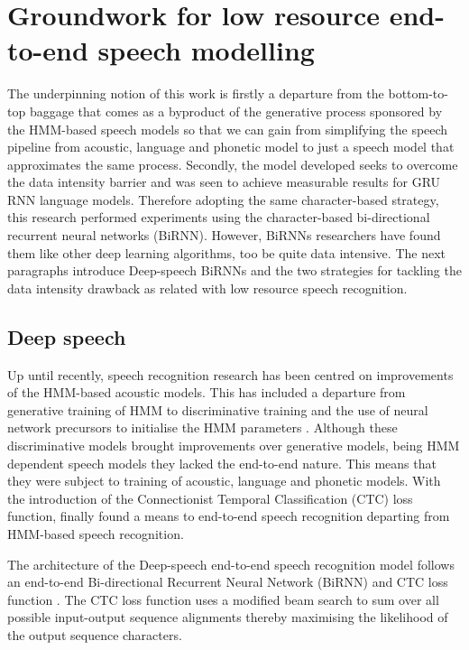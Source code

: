 \section{Groundwork for low resource end-to-end speech modelling}
The underpinning notion of this work is firstly a departure from the bottom-to-top baggage that comes as a byproduct of the generative process sponsored by the HMM-based speech models so that we can gain from simplifying the speech pipeline from acoustic, language and phonetic model to just a speech model that approximates the same process.  Secondly, the model developed seeks to overcome the data intensity barrier and was seen to achieve measurable results for GRU RNN language models.  Therefore adopting the same character-based strategy, this research performed experiments using the character-based bi-directional recurrent neural networks (BiRNN).  However, BiRNNs researchers have found them like other deep learning algorithms, too be quite data intensive\cite{hannun2014deep}.  The next paragraphs introduce Deep-speech BiRNNs and the two strategies for tackling the data intensity drawback as related with low resource speech recognition.

\subsection{Deep speech}
Up until recently, speech recognition research has been centred on improvements of the HMM-based acoustic models.  This has included a departure from generative training of HMM to discriminative training \citep{woodland2000large} and the use of neural network precursors to initialise the HMM parameters \citep{mohamed2012acoustic}.  Although these  discriminative models brought improvements over generative models, being HMM dependent speech models they lacked the end-to-end nature.  This means that they were subject to training of acoustic, language and phonetic models.  With the introduction of the Connectionist Temporal Classification (CTC) loss  function, \cite{graves2014towards} finally found a means to end-to-end speech recognition departing from HMM-based speech recognition. 

The architecture of the Deep-speech end-to-end speech recognition model \cite{hannun2014first} follows an end-to-end Bi-directional Recurrent Neural Network (BiRNN) and CTC loss function \citep{graves2006connectionist}.  The CTC loss function uses a modified beam search to sum over all possible input-output sequence alignments thereby maximising the likelihood of the output sequence characters.


